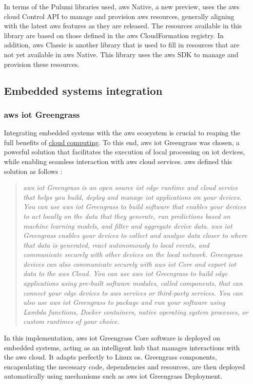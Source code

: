 In terms of the Pulumi libraries used, \gls{aws} Native, a new preview, uses the \gls{aws} \Gls{cloud} Control API to manage and provision \gls{aws} resources, generally aligning with the latest \gls{aws} features as they are released. The resources available in this library are based on those defined in the \gls{aws} CloudFormation registry. In addition, \gls{aws} Classic is another library that is used to fill in resources that are not yet available in \gls{aws} Native. This library uses the \gls{aws} SDK to manage and provision these resources.


\subsection{Embedded systems integration}
\subsubsection{\gls{aws} \acrshort{iot} Greengrass}
Integrating embedded systems with the \gls{aws} ecosystem is crucial to reaping the full benefits of \hyperref[subsec:cloudcomputing]{cloud computing}. To this end, \gls{aws} \acrshort{iot} Greengrass was chosen, a powerful solution that facilitates the execution of local processing on \acrshort{iot} devices, while enabling seamless interaction with \gls{aws} \gls{cloud} services. \gls{aws} defined this solution as follows :
\begin{quote}
    \textit{\gls{aws} \acrshort{iot} Greengrass is an open source \acrfull{iot} edge runtime and \gls{cloud} service that helps you build, deploy and manage \acrshort{iot} applications on your devices. You can use \gls{aws} \acrshort{iot} Greengrass to build software that enables your devices to act locally on the data that they generate, run predictions based on machine learning models, and filter and aggregate device data. \gls{aws} \acrshort{iot} Greengrass enables your devices to collect and analyze data closer to where that data is generated, react autonomously to local events, and communicate securely with other devices on the local network. Greengrass devices can also communicate securely with \gls{aws} \acrshort{iot} Core and export \acrshort{iot} data to the \gls{aws} Cloud. You can use \gls{aws} \acrshort{iot} Greengrass to build edge applications using pre-built software modules, called components, that can connect your edge devices to \gls{aws} services or third-party services. You can also use \gls{aws} \acrshort{iot} Greengrass to package and run your software using Lambda functions, Docker containers, native operating system processes, or custom runtimes of your choice. \cite{aws_iot_greengrass}}\\
\end{quote}
In this implementation, \gls{aws} \acrshort{iot} Greengrass Core software is deployed on embedded systems, acting as an intelligent hub that manages interactions with the \gls{aws} \gls{cloud}. It adapts perfectly to Linux \acrshort{os}. Greengrass components, encapsulating the necessary code, dependencies and resources, are then deployed automatically using mechanisms such as \gls{aws} \acrshort{iot} Greengrass Deployment.

